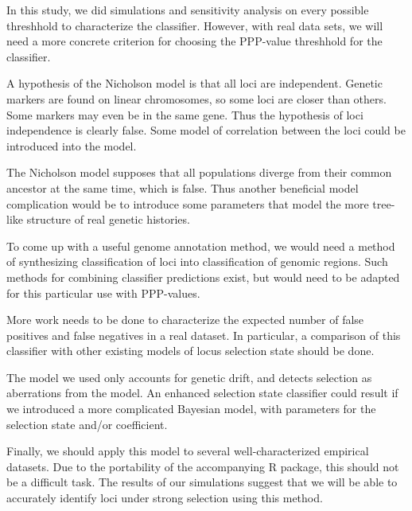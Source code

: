 \documentclass[a4paper,12pt]{article}
\begin{document}
In this study, we did simulations and sensitivity analysis on every
possible threshhold to characterize the classifier. However, with real
data sets, we will need a more concrete criterion for choosing the
PPP-value threshhold for the classifier.

A hypothesis of the Nicholson model is that all loci are
independent. Genetic markers are found on linear chromosomes, so some
loci are closer than others. Some markers may even be in the same
gene. Thus the hypothesis of loci independence is clearly false. Some
model of correlation between the loci could be introduced into the
model.

The Nicholson model supposes that all populations diverge from their
common ancestor at the same time, which is false. Thus another
beneficial model complication would be to introduce some parameters
that model the more tree-like structure of real genetic histories.

To come up with a useful genome annotation method, we would need a
method of synthesizing classification of loci into classification of
genomic regions. Such methods for combining classifier predictions
exist, but would need to be adapted for this particular use with
PPP-values.

More work needs to be done to characterize the expected number of
false positives and false negatives in a real dataset. In particular,
a comparison of this classifier with other existing models of locus
selection state should be done.

The model we used only accounts for genetic drift, and detects
selection as aberrations from the model. An enhanced selection state
classifier could result if we introduced a more complicated Bayesian
model, with parameters for the selection state and/or coefficient.

Finally, we should apply this model to several well-characterized
empirical datasets. Due to the portability of the accompanying R
package, this should not be a difficult task. The results of our
simulations suggest that we will be able to accurately identify loci
under strong selection using this method.



\end{document}
